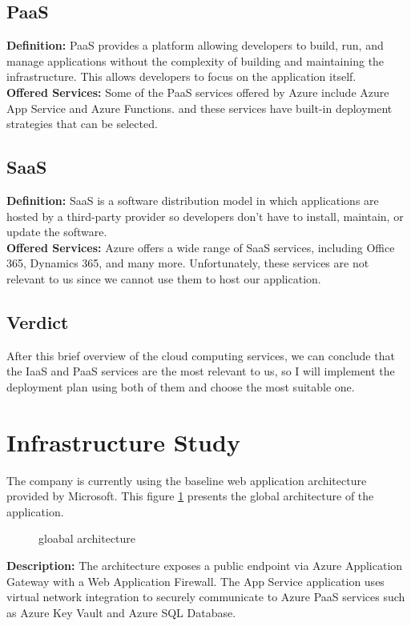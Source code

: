 \subsection*{PaaS}
\noindent
\textbf{Definition:} PaaS provides a platform allowing developers to build, run, and manage applications without the complexity of building and maintaining the infrastructure. This allows developers to focus on the application itself.
\noindent \\
\textbf{Offered Services:} Some of the PaaS services offered by Azure include Azure App Service and Azure Functions. and these services have built-in deployment strategies that can be selected.
\subsection*{SaaS}
\noindent
\textbf{Definition:} SaaS is a software distribution model in which applications are hosted by a third-party provider so developers don't have to install, maintain, or update the software.
\noindent \\
\textbf{Offered Services:} Azure offers a wide range of SaaS services, including Office 365, Dynamics 365, and many more. Unfortunately, these services are not relevant to us since we cannot use them to host our application.
\subsection*{Verdict}
After this brief overview of the cloud computing services, we can conclude that the IaaS and PaaS services are the most relevant to us, so I will implement the deployment plan using both of them and choose the most suitable one.
\section{Infrastructure Study}
The company is currently using the baseline web application architecture provided by Microsoft\cite{webArticle6}.
This figure \ref{fig:gloabal_architecture} presents the global architecture of the application.

\begin{figure}[htpb]
    \centering
    \caption{gloabal architecture}
    \label{fig:gloabal_architecture}
\end{figure}

\noindent \textbf{Description:} The architecture exposes a public endpoint via Azure Application Gateway with a Web Application Firewall. The App Service application uses virtual network integration to securely communicate to Azure PaaS services such as Azure Key Vault and Azure SQL Database.

